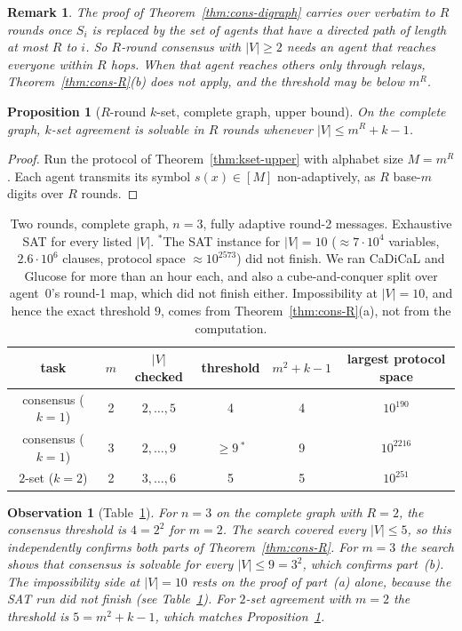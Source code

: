 \documentclass[11pt]{article}
\newtheorem{remark}[theorem]{Remark}
\newtheorem{proposition}[theorem]{Proposition}
\newtheorem{observation}[theorem]{Observation}
\begin{document}
\begin{remark}
The proof of Theorem~\ref{thm:cons-digraph} carries over verbatim to $R$ rounds once $S_i$ is replaced by the set of agents that have a directed path of length at most $R$ to $i$. So $R$-round consensus with $|V|\ge2$ needs an agent that reaches everyone within $R$ hops. When that agent reaches others only through relays, Theorem~\ref{thm:cons-R}(b) does not apply, and the threshold may be below $m^R$.
\end{remark}

\begin{proposition}[$R$-round $k$-set, complete graph, upper bound]\label{prop:kset-R-upper}
On the complete graph, $k$-set agreement is solvable in $R$ rounds whenever $|V|\le m^R+k-1$.
\end{proposition}
\begin{proof}
Run the protocol of Theorem~\ref{thm:kset-upper} with alphabet size $M=m^R$. Each agent transmits its symbol $s(x)\in[M]$ non-adaptively, as $R$ base-$m$ digits over $R$ rounds.
\end{proof}

\begin{table}[ht]
\centering
\begin{tabular}{cc|c|c|c|c}
\hline
task & $m$ & $|V|$ checked & threshold & $m^2+k-1$ & largest protocol space\\
\hline
consensus ($k=1$) & 2 & $2,\dots,5$ & 4 & 4 & $10^{190}$\\
consensus ($k=1$) & 3 & $2,\dots,9$ & $\ge 9$\,$^{*}$ & 9 & $10^{2216}$\\
$2$-set ($k=2$)   & 2 & $3,\dots,6$ & 5 & 5 & $10^{251}$\\
\hline
\end{tabular}
\caption{Two rounds, complete graph, $n=3$, fully adaptive round-2 messages. Exhaustive SAT for every listed $|V|$. $^{*}$The SAT instance for $|V|=10$ ($\approx7\cdot10^4$ variables, $2.6\cdot10^6$ clauses, protocol space $\approx10^{2573}$) did not finish. We ran CaDiCaL and Glucose for more than an hour each, and also a cube-and-conquer split over agent~0's round-1 map, which did not finish either. Impossibility at $|V|=10$, and hence the exact threshold $9$, comes from Theorem~\ref{thm:cons-R}(a), not from the computation.}\label{tab:r2}
\end{table}

\begin{observation}[Table~\ref{tab:r2}]\label{obs:r2}
For $n=3$ on the complete graph with $R=2$, the consensus threshold is $4=2^2$ for $m=2$. The search covered every $|V|\le5$, so this independently confirms both parts of Theorem~\ref{thm:cons-R}. For $m=3$ the search shows that consensus is solvable for every $|V|\le9=3^2$, which confirms part~(b). The impossibility side at $|V|=10$ rests on the proof of part~(a) alone, because the SAT run did not finish (see Table~\ref{tab:r2}). For $2$-set agreement with $m=2$ the threshold is $5=m^2+k-1$, which matches Proposition~\ref{prop:kset-R-upper}.
\end{observation}
\end{document}
